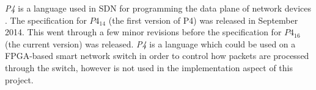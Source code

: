 

\textit{P4} is a language used in SDN for programming the data plane of network devices \cite{P4}. The specification for $P4_{14}$ (the first version of P4) was released in September 2014. This went through a few minor revisions before the specification for $P4_{16}$ (the current version) was released. \textit{P4} is a language which could be used on a FPGA-based smart network switch in order to control how packets are processed through the switch, however is not used in the implementation aspect of this project.

